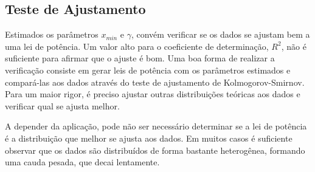 ﻿\documentclass{article}
\begin{document}
\subsection{Teste de Ajustamento}

Estimados os parâmetros $x_{min}$ e $\gamma$, convém verificar se os dados se ajustam bem a uma lei de potência. Um valor alto para o coeficiente de determinação, $R^2$, não é suficiente para afirmar que o ajuste é bom. Uma boa forma de realizar a verificação consiste em gerar leis de potência com os parâmetros estimados e compará-las aos dados através do teste de ajustamento de Kolmogorov-Smirnov. Para um maior rigor, é preciso ajustar outras distribuições teóricas aos dados e verificar qual se ajusta melhor.

A depender da aplicação, pode não ser necessário determinar se 
a lei de potência é a distribuição que melhor se ajusta aos dados. Em muitos casos é suficiente observar que os dados são distribuídos de forma bastante heterogênea, formando uma cauda pesada, que decai lentamente. 





% 
% 
% 
% 
% 
% 
% 
% 
\end{document}
